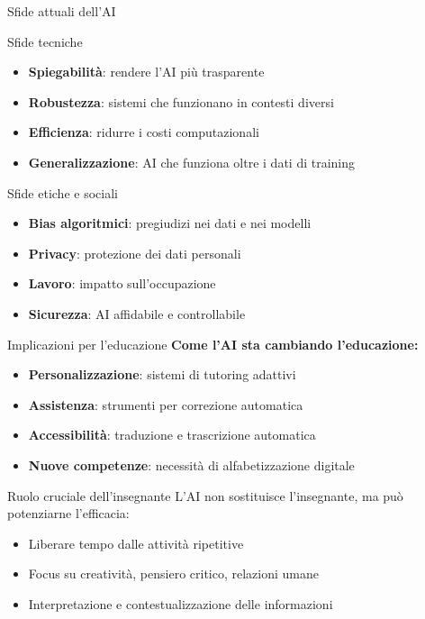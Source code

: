 \documentclass[aspectratio=169,12pt]{beamer}
\begin{document}
\begin{frame}{Sfide attuali dell'AI}
    \begin{block}{Sfide tecniche}
        \begin{itemize}
            \item \textbf{Spiegabilità}: rendere l'AI più trasparente
            \item \textbf{Robustezza}: sistemi che funzionano in contesti diversi
            \item \textbf{Efficienza}: ridurre i costi computazionali
            \item \textbf{Generalizzazione}: AI che funziona oltre i dati di training
        \end{itemize}
    \end{block}
    
    \begin{block}{Sfide etiche e sociali}
        \begin{itemize}
            \item \textbf{Bias algoritmici}: pregiudizi nei dati e nei modelli
            \item \textbf{Privacy}: protezione dei dati personali
            \item \textbf{Lavoro}: impatto sull'occupazione
            \item \textbf{Sicurezza}: AI affidabile e controllabile
        \end{itemize}
    \end{block}
\end{frame}
%
%
\begin{frame}{Implicazioni per l'educazione}
    \textbf{Come l'AI sta cambiando l'educazione:}
    
    \begin{itemize}
        \item \textbf{Personalizzazione}: sistemi di tutoring adattivi
        \item \textbf{Assistenza}: strumenti per correzione automatica
        \item \textbf{Accessibilità}: traduzione e trascrizione automatica
        \item \textbf{Nuove competenze}: necessità di alfabetizzazione digitale
    \end{itemize}
    
    \vspace{0.5cm}
    
    \begin{alertblock}{Ruolo cruciale dell'insegnante}
        L'AI non sostituisce l'insegnante, ma può potenziarne l'efficacia:
        \begin{itemize}
            \item Liberare tempo dalle attività ripetitive
            \item Focus su creatività, pensiero critico, relazioni umane
            \item Interpretazione e contestualizzazione delle informazioni
        \end{itemize}
    \end{alertblock}
\end{frame}
\end{document}
